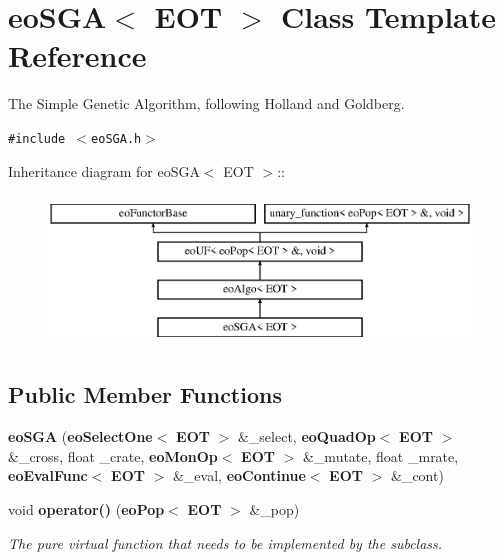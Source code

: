 \section{eo\-SGA$<$ EOT $>$ Class Template Reference}
\label{classeo_s_g_a}
The Simple Genetic Algorithm, following Holland and Goldberg.  


{\tt \#include $<$eo\-SGA.h$>$}

Inheritance diagram for eo\-SGA$<$ EOT $>$::\begin{figure}[H]
\begin{center}
\leavevmode
\includegraphics[height=4cm]{classeo_s_g_a}
\end{center}
\end{figure}
\subsection*{Public Member Functions}
\begin{CompactItemize}
\item 
{\bf eo\-SGA} ({\bf eo\-Select\-One}$<$ {\bf EOT} $>$ \&\_\-select, {\bf eo\-Quad\-Op}$<$ {\bf EOT} $>$ \&\_\-cross, float \_\-crate, {\bf eo\-Mon\-Op}$<$ {\bf EOT} $>$ \&\_\-mutate, float \_\-mrate, {\bf eo\-Eval\-Func}$<$ {\bf EOT} $>$ \&\_\-eval, {\bf eo\-Continue}$<$ {\bf EOT} $>$ \&\_\-cont)\label{classeo_s_g_a_a0}

\item 
void {\bf operator()} ({\bf eo\-Pop}$<$ {\bf EOT} $>$ \&\_\-pop)\label{classeo_s_g_a_a1}

\begin{CompactList}\small\item\em The pure virtual function that needs to be implemented by the subclass. \item\end{CompactList}\end{CompactItemize}

